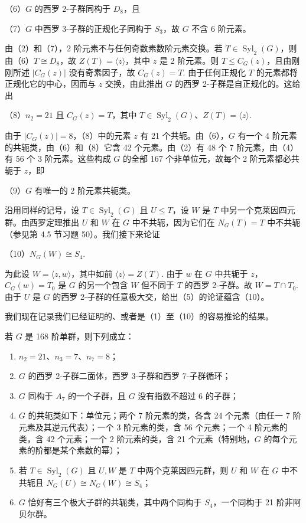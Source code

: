 \noindent（6）\(G\) 的西罗 2-子群同构于 \(D_8\)，且

\noindent（7）\(G\) 中西罗 3-子群的正规化子同构于 \(S_3\)，故 \(G\) 不含 6 阶元素。

由（2）和（7），2 阶元素不与任何奇数素数阶元素交换。若 \(T \in \operatorname{Syl}_2(G)\)，则由（6）\(T \cong D_8\)，故 \(Z(T) = \langle z \rangle\)，其中 \(z\) 是 2 阶元素。则 \(T \leq C_G(z)\)，且由刚刚所述 \(|C_G(z)|\) 没有奇素因子，故 \(C_G(z) = T\). 由于任何正规化 \(T\) 的元素都将正规化它的中心，因而与 \(z\) 交换，由此推出 \(G\) 的西罗 2-子群是自正规化的。这给出

\noindent（8）\(n_2 = 21\) 且 \(C_G(z) = T\)，其中 \(T \in \operatorname{Syl}_2(G)\)、\(Z(T) = \langle z \rangle\).

由于 \(|C_G(z)| = 8\)，（8）中的元素 \(z\) 有 21 个共轭。由（6），\(G\) 有一个 4 阶元素的共轭类，由（6）和（8）它含 42 个元素。由（2）有 48 个 7 阶元素，由（4）有 56 个 3 阶元素。这些构成 \(G\) 的全部 167 个非单位元，故每个 2 阶元素都必共轭于 \(z\)，即

\noindent（9）\(G\) 有唯一的 2 阶元素共轭类。

沿用同样的记号，设 \(T \in \operatorname{Syl}_2(G)\) 且 \(U \leq T\)，设 \(W\) 是 \(T\) 中另一个克莱因四元群。由西罗定理推出 \(U\) 和 \(W\) 在 \(G\) 中不共轭，因为它们在 \(N_G(T) = T\) 中不共轭（参见第 4.5 节习题 50）。我们接下来论证

\noindent（10）\(N_G(W) \cong S_4\).

为此设 \(W = \langle z, w \rangle\)，其中如前 \(\langle z \rangle = Z(T)\). 由于 \(w\) 在 \(G\) 中共轭于 \(z\)，\(C_G(w) = T_0\) 是 \(G\) 的另一个包含 \(W\) 但不同于 \(T\) 的西罗 2-子群。故 \(W = T \cap T_0\). 由于 \(U\) 是 \(G\) 的西罗 2-子群的任意极大交，给出（5）的论证蕴含（10）。

我们现在记录我们已经证明的、或者是（1）至（10）的容易推论的结果。

\begin{proposition}\label{pro:6.14}
若 \(G\) 是 168 阶单群，则下列成立：

\begin{enumerate}[label=(\arabic*)]
\item \(n_2 = 21\)、\(n_3 = 7\)、\(n_7 = 8\)；
\item \(G\) 的西罗 2-子群二面体，西罗 3-子群和西罗 7-子群循环；
\item \(G\) 同构于 \(A_7\) 的一个子群，且 \(G\) 没有指数不超过 6 的子群；
\item \(G\) 的共轭类如下：单位元；两个 7 阶元素的类，各含 24 个元素（由任一 7 阶元素及其逆元代表）；一个 3 阶元素的类，含 56 个元素；一个 4 阶元素的类，含 42 个元素；一个 2 阶元素的类，含 21 个元素（特别地，\(G\) 的每个元素的阶都是某个素数的幂）；
\item 若 \(T \in \operatorname{Syl}_2(G)\) 且 \(U, W\) 是 \(T\) 中两个克莱因四元群，则 \(U\) 和 \(W\) 在 \(G\) 中不共轭且 \(N_G(U) \cong N_G(W) \cong S_4\)；
\item \(G\) 恰好有三个极大子群的共轭类，其中两个同构于 \(S_4\)，一个同构于 21 阶非阿贝尔群。
\end{enumerate}
\end{proposition}

